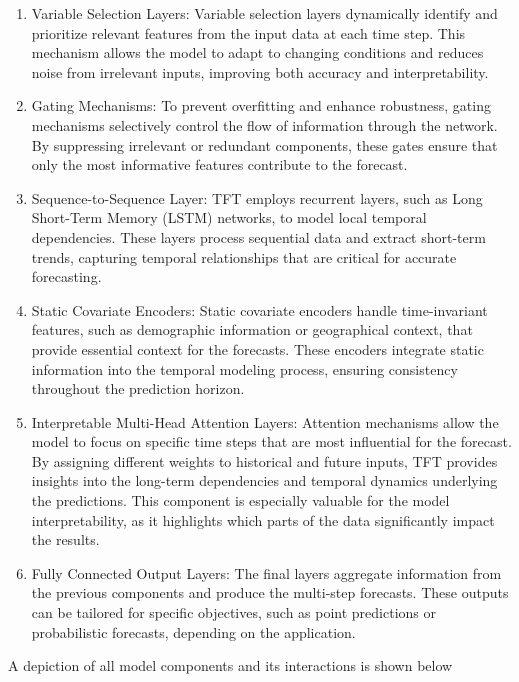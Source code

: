 \documentclass[a4paper]{article}
\begin{document}
\begin{enumerate}
\def\labelenumi{\arabic{enumi}.}
\item
  Variable Selection Layers: Variable selection layers dynamically
  identify and prioritize relevant features from the input data at each
  time step. This mechanism allows the model to adapt to changing
  conditions and reduces noise from irrelevant inputs, improving both
  accuracy and interpretability.
\item
  Gating Mechanisms: To prevent overfitting and enhance robustness,
  gating mechanisms selectively control the flow of information through
  the network. By suppressing irrelevant or redundant components, these
  gates ensure that only the most informative features contribute to the
  forecast.
\item
  Sequence-to-Sequence Layer: TFT employs recurrent layers, such as Long
  Short-Term Memory (LSTM) networks, to model local temporal
  dependencies. These layers process sequential data and extract
  short-term trends, capturing temporal relationships that are critical
  for accurate forecasting.
\item
  Static Covariate Encoders: Static covariate encoders handle
  time-invariant features, such as demographic information or
  geographical context, that provide essential context for the
  forecasts. These encoders integrate static information into the
  temporal modeling process, ensuring consistency throughout the
  prediction horizon.
\item
  Interpretable Multi-Head Attention Layers: Attention mechanisms allow
  the model to focus on specific time steps that are most influential
  for the forecast. By assigning different weights to historical and
  future inputs, TFT provides insights into the long-term dependencies
  and temporal dynamics underlying the predictions. This component is
  especially valuable for the model interpretability, as it highlights
  which parts of the data significantly impact the results.
\item
  Fully Connected Output Layers: The final layers aggregate information
  from the previous components and produce the multi-step forecasts.
  These outputs can be tailored for specific objectives, such as point
  predictions or probabilistic forecasts, depending on the application.
\end{enumerate}

A depiction of all model components and its interactions is shown below
\end{document}
